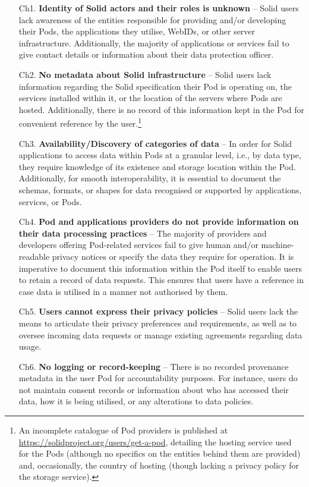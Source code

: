 \begin{enumerate}
    \item [Ch1.] \textbf{Identity of Solid actors and their roles is unknown} -- Solid users lack awareness of the entities responsible for providing and/or developing their Pods, the applications they utilise, WebIDs, or other server infrastructure. Additionally, the majority of applications or services fail to give contact details or information about their data protection officer.
    \item [Ch2.] \textbf{No metadata about Solid infrastructure} -- Solid users lack information regarding the Solid specification their Pod is operating on, the services installed within it, or the location of the servers where Pods are hosted. Additionally, there is no record of this information kept in the Pod for convenient reference by the user.\footnote{An incomplete catalogue of Pod providers is published at \url{https://solidproject.org/users/get-a-pod}, detailing the hosting service used for the Pods (although no specifics on the entities behind them are provided) and, occasionally, the country of hosting (though lacking a privacy policy for the storage service).}
    \item [Ch3.] \textbf{Availability/Discovery of categories of data} -- In order for Solid applications to access data within Pods at a granular level, i.e., by data type, they require knowledge of its existence and storage location within the Pod. Additionally, for smooth interoperability, it is essential to document the schemas, formats, or shapes for data recognised or supported by applications, services, or Pods.
    \item [Ch4.] \textbf{Pod and applications providers do not provide information on their data processing practices} -- The majority of providers and developers offering Pod-related services fail to give human and/or machine-readable privacy notices or specify the data they require for operation. It is imperative to document this information within the Pod itself to enable users to retain a record of data requests. This ensures that users have a reference in case data is utilised in a manner not authorised by them.
    \item [Ch5.] \textbf{Users cannot express their privacy policies} -- Solid users lack the means to articulate their privacy preferences and requirements, as well as to oversee incoming data requests or manage existing agreements regarding data usage.
    \item [Ch6.] \textbf{No logging or record-keeping} -- There is no recorded provenance metadata in the user Pod for accountability purposes. For instance, users do not maintain consent records or information about who has accessed their data, how it is being utilised, or any alterations to data policies.

\end{enumerate}
